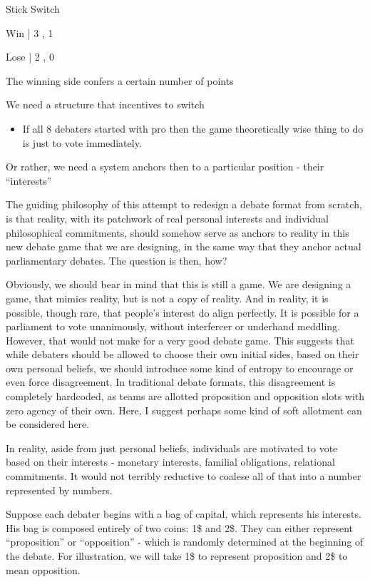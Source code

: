 Stick Switch

Win   | 3    , 1

Lose  |  2   , 0

The winning side confers a certain number of points

We need a structure that incentives to switch

\begin{itemize}
    \item If all 8 debaters started with pro then the game theoretically wise thing to do is just to vote immediately.
\end{itemize}

Or rather, we need a system anchors then to a particular position - their ``interests''

The guiding philosophy of this attempt to redesign a debate format from scratch, is that reality, with its patchwork of real personal interests and individual philosophical commitments, should somehow serve as anchors to reality in this new debate game that we are designing, in the same way that they anchor actual parliamentary debates. The question is then, how?

Obviously, we should bear in mind that this is still a game. We are designing a game, that mimics reality, but is not a copy of reality. And in reality, it is possible, though rare, that people's interest do align perfectly. It is possible for a parliament to vote unanimously, without interfercer or underhand meddling. However, that would not make for a very good debate game. This suggests that while debaters should be allowed to choose their own initial sides, based on their own personal beliefs, we should introduce some kind of entropy to encourage or even force disagreement. In traditional debate formats, this disagreement is completely hardcoded, as teams are allotted proposition and opposition slots with zero agency of their own. Here, I suggest perhaps some kind of soft allotment can be considered here.

In reality, aside from just personal beliefs, individuals are motivated to vote based on their interests - monetary interests, familial obligations, relational commitments. It would not terribly reductive to coalese all of that into a number represented by numbers.

Suppose each debater begins with a bag of capital, which represents his interests. His bag is composed entirely of two coins: 1\$ and 2\$. They can either represent ``proposition'' or ``opposition'' - which is randomly determined at the beginning of the debate. For illustration, we will take 1\$ to represent proposition and 2\$ to mean opposition.


